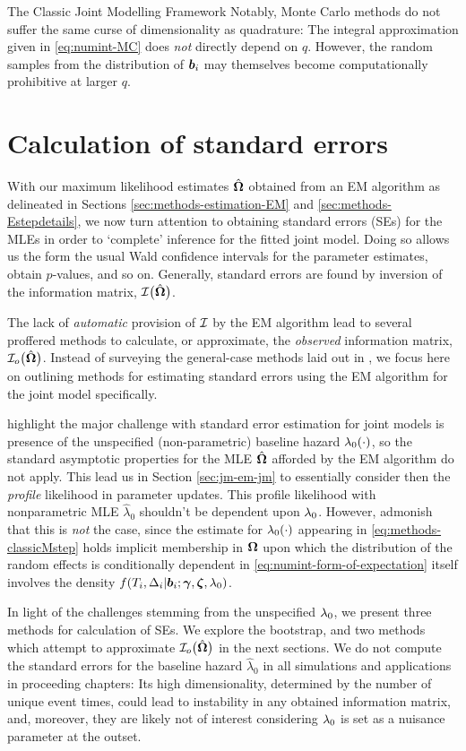 \begin{chapter}{\label{cha:methods-classic}The Classic Joint Modelling Framework}
Notably, Monte Carlo methods do not suffer the same curse of dimensionality as quadrature: The integral approximation given in \eqref{eq:numint-MC} does \textit{not} directly depend on $q$. However, the random samples from the distribution of $\bm{b}_i$ may themselves become computationally prohibitive at larger $q$.
  
  \section{Calculation of standard errors}\label{sec:methods-SEs}
  With our maximum likelihood estimates $\hat{\bm{\Omega}}$ obtained from an EM algorithm as delineated in Sections \ref{sec:methods-estimation-EM} and \ref{sec:methods-Estepdetails}, we now turn attention to obtaining standard errors (SEs) for the MLEs in order to `complete' inference for the fitted joint model. Doing so allows us the form the usual Wald confidence intervals for the parameter estimates, obtain $p$-values, and so on. Generally, standard errors are found by inversion of the information matrix, $\mathcal{I}\big(\hat{\bm{\Omega}}\big)$. 
  
  The lack of \textit{automatic} provision of $\cal I$ by the EM algorithm lead to several proffered methods to calculate, or approximate, the \textit{observed} information matrix, $\mathcal{I}_o\big(\hat{\bm{\Omega}}\big)$. Instead of surveying the general-case methods laid out in \citet{Mclachlan08}, we focus here on outlining methods for estimating standard errors using the EM algorithm for the joint model specifically.

  \citet{Hsieh2006} highlight the major challenge with standard error estimation for joint models is presence of the unspecified (\ie non-parametric) baseline hazard $\lambda_0\!\left(\cdot\right)$, so the standard asymptotic properties for the MLE $\hat{\bm{\Omega}}$ afforded by the EM algorithm do not apply. This lead us in Section \ref{sec:jm-em-jm} to essentially consider then the \textit{profile} likelihood in parameter updates. This profile likelihood with nonparametric MLE $\hat{\lambda}_0$ shouldn't be dependent upon $\lambda_0$. However, \citet{Hsieh2006} admonish that this is \textit{not} the case, since the estimate for $\lambda_0\!\left(\cdot\right)$ appearing in \eqref{eq:methods-classicMstep} holds implicit membership in $\bm{\mathrm{\Omega}}$ upon which the distribution of the random effects is conditionally dependent in \eqref{eq:numint-form-of-expectation} \ie itself involves the density $f\!\left( T_i,\Delta_i|\bm{b}_i;\bm{\gamma},\bm{\zeta},\lambda_0\right)$.

  In light of the challenges stemming from the unspecified $\lambda_0$, we present three methods for calculation of SEs. We explore the bootstrap, and two methods which attempt to approximate $\mathcal{I}_o\big(\hat{\bm{\Omega}}\big)$ in the next sections. We do not compute the standard errors for the baseline hazard $\hat{\lambda}_0$ in all simulations and applications in proceeding chapters: Its high dimensionality, determined by the number of unique event times, could lead to instability in any obtained information matrix, and, moreover, they are likely not of interest considering $\lambda_0$ is set as a nuisance parameter at the outset.
  

\end{chapter}
